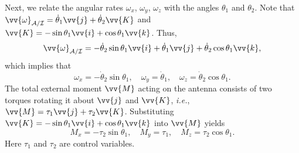 \documentclass{ifacconf}
\begin{document}
Next, we relate the angular rates $\omega_{x}$, $\omega_{y}$, $\omega_{z}$ with the angles $\theta_1$ and $\theta_2$. Note that $\vv{\omega}_{\mathcal{A}/\mathcal{I}}=\dot{\theta}_1\vv{j}+\dot{\theta}_{2}\vv{K}$ and $\vv{K}=-\sin\theta_1\vv{i}+\cos\theta_1\vv{k}$. Thus, 
\begin{equation*}
    \vv{\omega}_{\mathcal{A}/\mathcal{I}}=-\dot{\theta}_{2}\sin\theta_1\vv{i}+\dot{\theta}_{1}\vv{j}+\dot{\theta}_{2}\cos\theta_1\vv{k},
\end{equation*}
which implies that 
\begin{equation}\label{omega}
    \omega_x=-\dot{\theta}_{2}\sin\theta_1,\quad
    \omega_y=\dot{\theta}_{1},\quad
    \omega_z=\dot{\theta}_{2}\cos\theta_1.
\end{equation}
The total external moment $\vv{M}$ acting on the antenna consists of two torques rotating it about $\vv{j}$ and $\vv{K}$, \textit{i.e.}, $\vv{M}=\tau_1 \vv{j} + \tau_2 \vv{K}$. Substituting $\vv{K}=-\sin\theta_1\vv{i}+\cos\theta_1\vv{k}$ into $\vv{M}$ yields
\begin{equation}\label{moments}
    M_x=-\tau_2\sin\theta_1,\quad
    M_y=\tau_{1},\quad
    M_z=\tau_2\cos\theta_1.
\end{equation}
Here $\tau_{1}$ and $\tau_{2}$ are control variables. 
\end{document}
